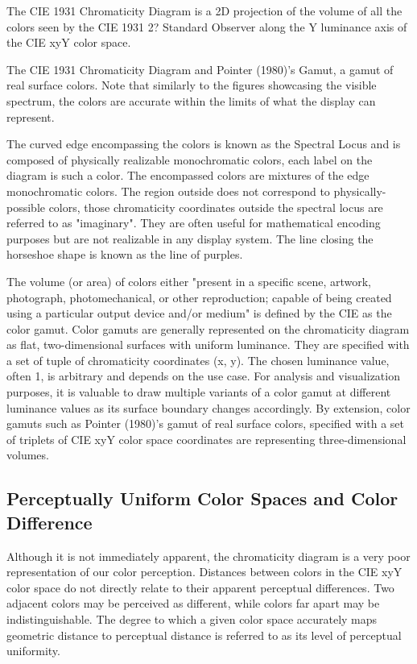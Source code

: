 The CIE 1931 Chromaticity Diagram is a 2D projection of the volume of all the colors seen by the CIE 1931 2? Standard Observer along the Y luminance axis of the CIE xyY color space.

The CIE 1931 Chromaticity Diagram and Pointer (1980)'s Gamut, a gamut of real surface colors. Note that similarly to the figures showcasing the visible spectrum, the colors are accurate within the limits of what the display can represent.

The curved edge encompassing the colors is known as the Spectral Locus and is composed of physically realizable monochromatic colors, each label on the diagram is such a color. The encompassed colors are mixtures of the edge monochromatic colors. The region outside does not correspond to physically-possible colors, those chromaticity coordinates outside the spectral locus are referred to as "imaginary". They are often useful for mathematical encoding purposes but are not realizable in any display system. The line closing the horseshoe shape is known as the line of purples.

The volume (or area) of colors either "present in a specific scene, artwork, photograph, photomechanical, or other reproduction; capable of being created using a particular output device and/or medium" is defined by the CIE as the color gamut. Color gamuts are generally represented on the chromaticity diagram as flat, two-dimensional surfaces with uniform luminance. They are specified with a set of tuple of chromaticity coordinates (x, y). The chosen luminance value, often 1, is arbitrary and depends on the use case. For analysis and visualization purposes, it is valuable to draw multiple variants of a color gamut at different luminance values as its surface boundary changes accordingly. By extension, color gamuts such as Pointer (1980)'s gamut of real surface colors, specified with a set of triplets of CIE xyY color space coordinates are representing three-dimensional volumes.

\subsection{Perceptually Uniform Color Spaces and Color Difference}%
\label{subsec:perceptually-uniform-color-spaces-and-color-difference}

Although it is not immediately apparent, the chromaticity diagram is a very poor representation of our color perception. Distances between colors in the CIE xyY color space do not directly relate to their apparent perceptual differences. Two adjacent colors may be perceived as different, while colors far apart may be indistinguishable. The degree to which a given color space accurately maps geometric distance to perceptual distance is referred to as its level of perceptual uniformity.


